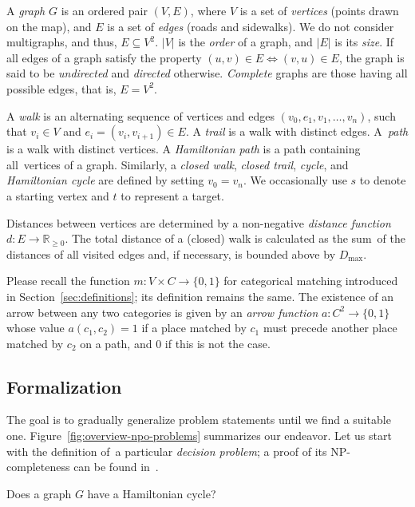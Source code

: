 A \emph{graph} $G$ is an ordered pair $(V, E)$, where $V$ is a set of \emph{vertices} (points drawn on the map), and $E$ is a set of \emph{edges} (roads and sidewalks). We do not consider multigraphs, and thus, $E \subseteq V^{2}$. $\left| V \right|$ is the \emph{order} of a graph, and $\left| E \right|$ is its \emph{size}. If all edges of a graph satisfy the property $(u, v) \in E \Leftrightarrow (v, u) \in E$, the graph is said to be \emph{undirected} and \emph{directed} otherwise. \emph{Complete} graphs are those having all possible edges, that is, $E = V^{2}$.

A \emph{walk} is an alternating sequence of vertices and edges $(v_{0}, e_{1}, v_{1}, \ldots, v_{n})$, such that $v_{i} \in V$ and $e_{i} = (v_{i}, v_{i+1}) \in E$. A \emph{trail} is a walk with distinct edges. A~\emph{path} is a walk with distinct vertices. A \emph{Hamiltonian path} is a path containing all~vertices of a graph. Similarly, a \emph{closed walk}, \emph{closed trail}, \emph{cycle}, and \emph{Hamiltonian cycle} are defined by setting $v_{0} = v_{n}$. We occasionally use $s$ to denote a starting vertex and $t$ to represent a target.

Distances between vertices are determined by a non-negative \emph{distance function} $d: E \to \mathbb{R}_{\geq 0}$. The total distance of a (closed) walk is calculated as the sum~of the dis\-tances of all visited edges and, if necessary, is bounded above by $D_{\text{max}}$.

Please recall the function $m : V \times C \to \{ 0, 1 \}$ for categorical matching introduced in Section~\ref{sec:definitions}; its definition remains the same. The exis\-tence of an arrow between any two categories is given by an \emph{arrow function} $a: C^{2} \to \{ 0, 1 \}$ whose value $a(c_{1}, c_{2}) = 1$ if a place matched by $c_{1}$ must precede another place matched by $c_{2}$ on a path, and $0$ if this is not the case.

\subsection{Formalization}\label{ssec:formalization}

The goal is to gradually generalize problem statements until we find a suitable one. Figure~\ref{fig:overview-npo-problems} summarizes our endeavor. Let us start with the definition of~a particular \emph{decision problem}; a proof of its NP-completeness can be found in~\cite{karp72}.

\begin{definition}[HamCycle]
Does a graph $G$ have a Hamiltonian cycle?
\end{definition}

